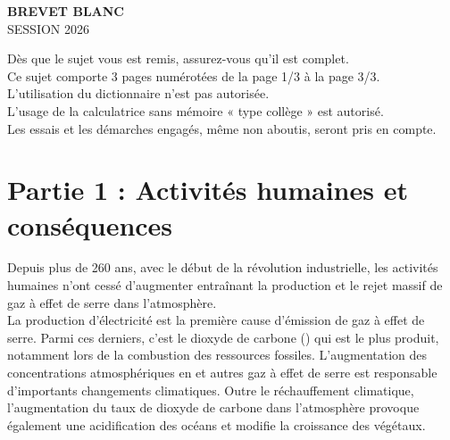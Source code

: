 \documentclass[12pt,a4paper]{article}
\begin{document}
\thispagestyle{fancy}

\begin{center}
  {\large\bfseries BREVET BLANC}\\[30pt]
  {\large SESSION 2026}\\[30pt]


\vspace{30pt}
\noindent
Dès que le sujet vous est remis, assurez-vous qu'il est complet.\\[20pt]
Ce sujet comporte 3 pages numérotées de la page 1/3 à la page 3/3.\\[20pt]
L’utilisation du dictionnaire n’est pas autorisée.\\
L’usage de la calculatrice sans mémoire « type collège » est autorisé.\\[30pt]
Les essais et les démarches engagés, même non aboutis, seront pris en compte.
\end{center}

\vspace{1cm}

\newpage

\section*{Partie 1 : Activités humaines et conséquences }

\noindent
Depuis plus de 260 ans, avec le début de la révolution industrielle, les activités humaines n’ont cessé d’augmenter entraînant la production et le rejet massif de gaz à effet de serre dans l’atmosphère.\\
La production d’électricité est la première cause d’émission de gaz à effet de serre. Parmi ces derniers, c’est le dioxyde de carbone () qui est le plus produit, notamment lors de la combustion des ressources fossiles. L’augmentation des concentrations atmosphériques en  et autres gaz à effet de serre est responsable d’importants changements climatiques. Outre le réchauffement climatique, l’augmentation du taux de dioxyde de carbone dans l’atmosphère provoque également une acidification des océans et modifie la croissance des végétaux.
\end{document}
